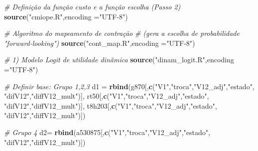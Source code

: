 \documentclass[12pt,a4paper]{article}
\newenvironment{Shaded}{\begin{snugshade}}{\end{snugshade}}
\newcommand{\CommentTok}[1]{\textcolor[rgb]{0.56,0.35,0.01}{\textit{#1}}}
\newcommand{\DataTypeTok}[1]{\textcolor[rgb]{0.13,0.29,0.53}{#1}}
\newcommand{\KeywordTok}[1]{\textcolor[rgb]{0.13,0.29,0.53}{\textbf{#1}}}
\newcommand{\NormalTok}[1]{#1}
\newcommand{\StringTok}[1]{\textcolor[rgb]{0.31,0.60,0.02}{#1}}
\begin{document}
\begin{Shaded}
\begin{Highlighting}[]
\CommentTok{# Definição da função custo e a função escolha (Passo 2)}
\KeywordTok{source}\NormalTok{(}\StringTok{"cmiope.R"}\NormalTok{,}\DataTypeTok{encoding =}\StringTok{"UTF-8"}\NormalTok{)}

\CommentTok{# Algoritmo do mapeamento de contração }
\CommentTok{# (gera a escolha de probabilidade "forward-looking")}
\KeywordTok{source}\NormalTok{(}\StringTok{"cont_map.R"}\NormalTok{,}\DataTypeTok{encoding =}\StringTok{"UTF-8"}\NormalTok{)}

\CommentTok{# 1) Modelo Logit de utilidade dinâmica}
\KeywordTok{source}\NormalTok{(}\StringTok{"dinam_logit.R"}\NormalTok{,}\DataTypeTok{encoding =}\StringTok{"UTF-8"}\NormalTok{)}


\CommentTok{# Definir base: Grupo 1,2,3}
\NormalTok{d1 =}\StringTok{ }\KeywordTok{rbind}\NormalTok{(g870[,}\KeywordTok{c}\NormalTok{(}\StringTok{"V1"}\NormalTok{,}\StringTok{"troca"}\NormalTok{,}\StringTok{"V12_adj"}\NormalTok{,}\StringTok{"estado"}\NormalTok{,}
                    \StringTok{"difV12"}\NormalTok{,}\StringTok{"diffV12_mult"}\NormalTok{)],}
\NormalTok{            rt50[,}\KeywordTok{c}\NormalTok{(}\StringTok{"V1"}\NormalTok{,}\StringTok{"troca"}\NormalTok{,}\StringTok{"V12_adj"}\NormalTok{,}\StringTok{"estado"}\NormalTok{,}
                    \StringTok{"difV12"}\NormalTok{,}\StringTok{"diffV12_mult"}\NormalTok{)],}
\NormalTok{            t8h203[,}\KeywordTok{c}\NormalTok{(}\StringTok{"V1"}\NormalTok{,}\StringTok{"troca"}\NormalTok{,}\StringTok{"V12_adj"}\NormalTok{,}\StringTok{"estado"}\NormalTok{,}
                      \StringTok{"difV12"}\NormalTok{,}\StringTok{"diffV12_mult"}\NormalTok{)])}

\CommentTok{# Grupo 4}
\NormalTok{d2=}\StringTok{ }\KeywordTok{rbind}\NormalTok{(a530875[,}\KeywordTok{c}\NormalTok{(}\StringTok{"V1"}\NormalTok{,}\StringTok{"troca"}\NormalTok{,}\StringTok{"V12_adj"}\NormalTok{,}\StringTok{"estado"}\NormalTok{,}
                      \StringTok{"difV12"}\NormalTok{,}\StringTok{"diffV12_mult"}\NormalTok{)])}


\end{Highlighting}
\end{Shaded}
\end{document}
